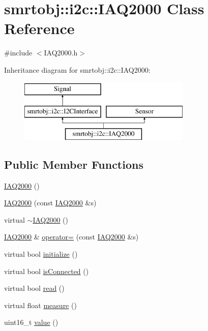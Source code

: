 \hypertarget{classsmrtobj_1_1i2c_1_1_i_a_q2000}{}\section{smrtobj\+:\+:i2c\+:\+:I\+A\+Q2000 Class Reference}
\label{classsmrtobj_1_1i2c_1_1_i_a_q2000}


{\ttfamily \#include $<$I\+A\+Q2000.\+h$>$}

Inheritance diagram for smrtobj\+:\+:i2c\+:\+:I\+A\+Q2000\+:\begin{figure}[H]
\begin{center}
\leavevmode
\includegraphics[height=3.000000cm]{classsmrtobj_1_1i2c_1_1_i_a_q2000}
\end{center}
\end{figure}
\subsection*{Public Member Functions}
\begin{DoxyCompactItemize}
\item 
\hyperlink{classsmrtobj_1_1i2c_1_1_i_a_q2000_a4261abb895def12fc22dcc528936d761}{I\+A\+Q2000} ()
\item 
\hyperlink{classsmrtobj_1_1i2c_1_1_i_a_q2000_a3562f73c2c8403fb86b8647051e22842}{I\+A\+Q2000} (const \hyperlink{classsmrtobj_1_1i2c_1_1_i_a_q2000}{I\+A\+Q2000} \&s)
\item 
virtual \hyperlink{classsmrtobj_1_1i2c_1_1_i_a_q2000_aa2cb430098fc621f69de12d74a1fc39f}{$\sim$\+I\+A\+Q2000} ()
\item 
\hyperlink{classsmrtobj_1_1i2c_1_1_i_a_q2000}{I\+A\+Q2000} \& \hyperlink{classsmrtobj_1_1i2c_1_1_i_a_q2000_a79a72c585448c25db99a0af5e8f660af}{operator=} (const \hyperlink{classsmrtobj_1_1i2c_1_1_i_a_q2000}{I\+A\+Q2000} \&s)
\item 
virtual bool \hyperlink{classsmrtobj_1_1i2c_1_1_i_a_q2000_ae586b35f7da1356a8acbe44e5e4911a1}{initialize} ()
\item 
virtual bool \hyperlink{classsmrtobj_1_1i2c_1_1_i_a_q2000_a3efac4a4e37fd0d061e69ba185df3100}{is\+Connected} ()
\item 
virtual bool \hyperlink{classsmrtobj_1_1i2c_1_1_i_a_q2000_a026848c4fca394f36929c7d831a675aa}{read} ()
\item 
virtual float \hyperlink{classsmrtobj_1_1i2c_1_1_i_a_q2000_ad1b66960d4ec931dd3535f7b220a2251}{measure} ()
\item 
uint16\+\_\+t \hyperlink{classsmrtobj_1_1i2c_1_1_i_a_q2000_ad08f070b9bb2ad32f3b16b69b44eb4f8}{value} ()
\end{DoxyCompactItemize}
